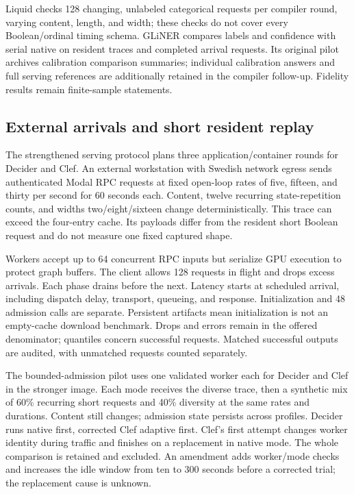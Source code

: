 \documentclass[10pt,twocolumn]{article}
\begin{document}
Liquid checks 128 changing, unlabeled categorical requests per compiler round, varying content, length, and width; these checks do not cover every Boolean/ordinal timing schema. GLiNER compares labels and confidence with serial native on resident traces and completed arrival requests. Its original pilot archives calibration comparison summaries; individual calibration answers and full serving references are additionally retained in the compiler follow-up. Fidelity results remain finite-sample statements.

\subsection{External arrivals and short resident replay}
The strengthened serving protocol plans three application/container rounds for Decider and Clef. An external workstation with Swedish network egress sends authenticated Modal RPC requests at fixed open-loop rates of five, fifteen, and thirty per second for 60 seconds each. Content, twelve recurring state-repetition counts, and widths two/eight/sixteen change deterministically. This trace can exceed the four-entry cache. Its payloads differ from the resident short Boolean request and do not measure one fixed captured shape.

Workers accept up to 64 concurrent RPC inputs but serialize GPU execution to protect graph buffers. The client allows 128 requests in flight and drops excess arrivals. Each phase drains before the next. Latency starts at scheduled arrival, including dispatch delay, transport, queueing, and response. Initialization and 48 admission calls are separate. Persistent artifacts mean initialization is not an empty-cache download benchmark. Drops and errors remain in the offered denominator; quantiles concern successful requests. Matched successful outputs are audited, with unmatched requests counted separately.

The bounded-admission pilot uses one validated worker each for Decider and Clef in the stronger image. Each mode receives the diverse trace, then a synthetic mix of 60\% recurring short requests and 40\% diversity at the same rates and durations. Content still changes; admission state persists across profiles. Decider runs native first, corrected Clef adaptive first. Clef's first attempt changes worker identity during traffic and finishes on a replacement in native mode. The whole comparison is retained and excluded. An amendment adds worker/mode checks and increases the idle window from ten to 300 seconds before a corrected trial; the replacement cause is unknown.
\end{document}
